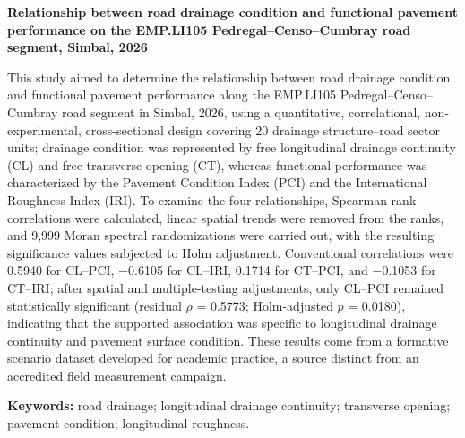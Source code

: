 \begin{center}
\textbf{Relationship between road drainage condition and functional pavement performance on the EMP.LI105 Pedregal--Censo--Cumbray road segment, Simbal, 2026}
\end{center}
This study aimed to determine the relationship between road drainage condition and functional pavement performance along the EMP.LI105 Pedregal--Censo--Cumbray road segment in Simbal, 2026, using a quantitative, correlational, non-experimental, cross-sectional design covering 20 drainage structure--road sector units; drainage condition was represented by free longitudinal drainage continuity (CL) and free transverse opening (CT), whereas functional performance was characterized by the Pavement Condition Index (PCI) and the International Roughness Index (IRI). To examine the four relationships, Spearman rank correlations were calculated, linear spatial trends were removed from the ranks, and 9,999 Moran spectral randomizations were carried out, with the resulting significance values subjected to Holm adjustment. Conventional correlations were 0.5940 for CL--PCI, $-$0.6105 for CL--IRI, 0.1714 for CT--PCI, and $-$0.1053 for CT--IRI; after spatial and multiple-testing adjustments, only CL--PCI remained statistically significant (residual $\rho$ = 0.5773; Holm-adjusted $p$ = 0.0180), indicating that the supported association was specific to longitudinal drainage continuity and pavement surface condition. These results come from a formative scenario dataset developed for academic practice, a source distinct from an accredited field measurement campaign.

\noindent\textbf{Keywords:} road drainage; longitudinal drainage continuity; transverse opening; pavement condition; longitudinal roughness.
